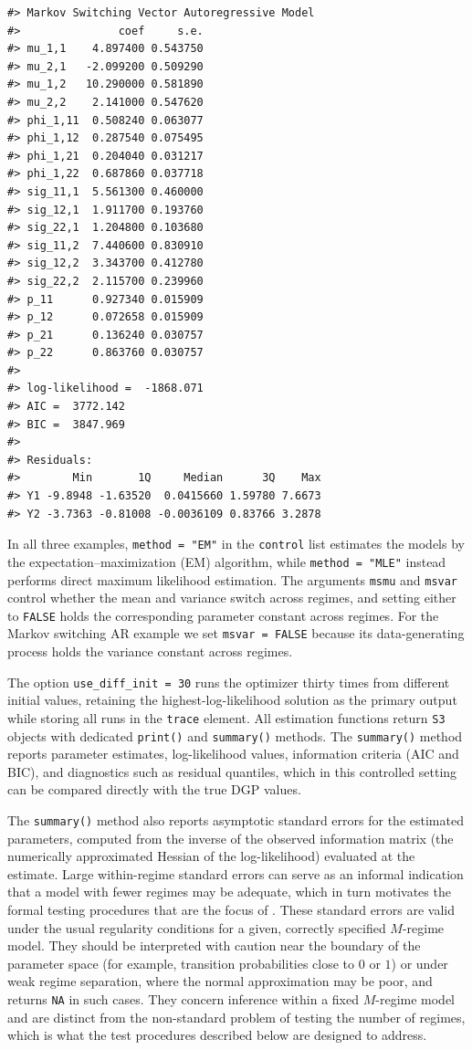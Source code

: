 \begin{verbatim}
#> Markov Switching Vector Autoregressive Model
#>               coef     s.e.
#> mu_1,1    4.897400 0.543750
#> mu_2,1   -2.099200 0.509290
#> mu_1,2   10.290000 0.581890
#> mu_2,2    2.141000 0.547620
#> phi_1,11  0.508240 0.063077
#> phi_1,12  0.287540 0.075495
#> phi_1,21  0.204040 0.031217
#> phi_1,22  0.687860 0.037718
#> sig_11,1  5.561300 0.460000
#> sig_12,1  1.911700 0.193760
#> sig_22,1  1.204800 0.103680
#> sig_11,2  7.440600 0.830910
#> sig_12,2  3.343700 0.412780
#> sig_22,2  2.115700 0.239960
#> p_11      0.927340 0.015909
#> p_12      0.072658 0.015909
#> p_21      0.136240 0.030757
#> p_22      0.863760 0.030757
#> 
#> log-likelihood =  -1868.071
#> AIC =  3772.142
#> BIC =  3847.969
#> 
#> Residuals:
#>        Min       1Q     Median      3Q    Max
#> Y1 -9.8948 -1.63520  0.0415660 1.59780 7.6673
#> Y2 -3.7363 -0.81008 -0.0036109 0.83766 3.2878
\end{verbatim}

In all three examples, \texttt{method\ =\ "EM"} in the \texttt{control} list estimates the models by the expectation--maximization (EM) algorithm, while \texttt{method\ =\ "MLE"} instead performs direct maximum likelihood estimation. The arguments \texttt{msmu} and \texttt{msvar} control whether the mean and variance switch across regimes, and setting either to \texttt{FALSE} holds the corresponding parameter constant across regimes. For the Markov switching AR example we set \texttt{msvar\ =\ FALSE} because its data-generating process holds the variance constant across regimes.

The option \texttt{use\_diff\_init\ =\ 30} runs the optimizer thirty times from different initial values, retaining the highest-log-likelihood solution as the primary output while storing all runs in the \texttt{trace} element. All estimation functions return \texttt{S3} objects with dedicated \texttt{print()} and \texttt{summary()} methods. The \texttt{summary()} method reports parameter estimates, log-likelihood values, information criteria (AIC and BIC), and diagnostics such as residual quantiles, which in this controlled setting can be compared directly with the true DGP values.

The \texttt{summary()} method also reports asymptotic standard errors for the estimated parameters, computed from the inverse of the observed information matrix (the numerically approximated Hessian of the log-likelihood) evaluated at the estimate. Large within-regime standard errors can serve as an informal indication that a model with fewer regimes may be adequate, which in turn motivates the formal testing procedures that are the focus of . These standard errors are valid under the usual regularity conditions for a given, correctly specified \(M\)-regime model. They should be interpreted with caution near the boundary of the parameter space (for example, transition probabilities close to \(0\) or \(1\)) or under weak regime separation, where the normal approximation may be poor, and  returns \texttt{NA} in such cases. They concern inference within a fixed \(M\)-regime model and are distinct from the non-standard problem of testing the number of regimes, which is what the test procedures described below are designed to address.

